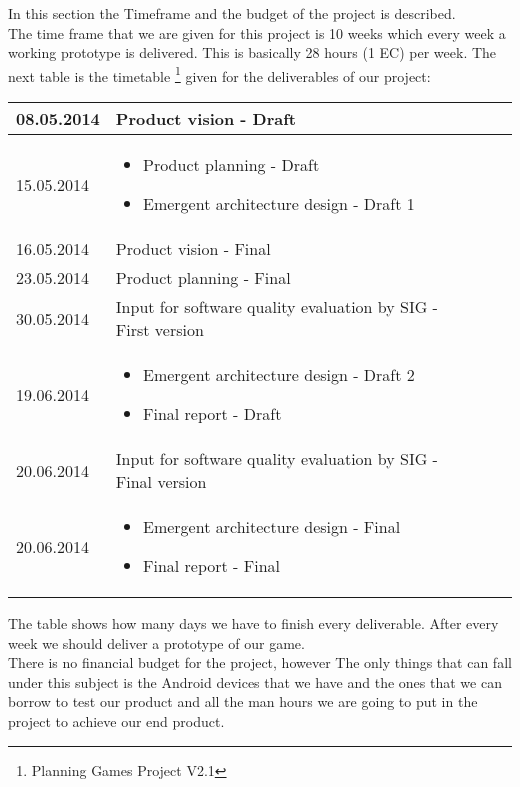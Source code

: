 In this section the Timeframe and the budget of the project is described. \\
The time frame that we are given for this project is 10 weeks which every week a working prototype is delivered. This is basically 28 hours (1 EC) per week. 
The next table is the timetable \footnote{Planning Games Project V2.1} given for the deliverables of our project:
\begin{center}
	\begin{tabular}{|  p{5cm} l || p{10cm}  l }
		\hline
	 	08.05.2014 & Product vision - Draft \\ \hline
		15.05.2014 & 
		\begin{itemize}
			\item Product planning - Draft
			\item Emergent architecture design - Draft 1
		\end{itemize} \\ \hline
		16.05.2014 & Product vision - Final \\ \hline
		23.05.2014 & Product planning - Final \\ \hline
		30.05.2014 & Input for software quality evaluation by SIG - First version \\ \hline
		19.06.2014 &
		\begin{itemize}
			\item Emergent architecture design - Draft 2
			\item Final report - Draft
		\end{itemize} \\ \hline
		20.06.2014 & Input for software quality evaluation by SIG - Final version \\ \hline
		20.06.2014 &
		\begin{itemize}
			\item Emergent architecture design - Final
			\item Final report - Final
		\end{itemize} \\
		\hline
	\end{tabular}
\end{center}
The table shows how many days we have to finish every deliverable. After every week we should deliver a prototype of our game. \\
\newline
There is no financial budget for the project, however The only things that can fall under this subject is the Android devices that we have and the ones that we can borrow to test our product and all the man hours we are going to put in the project to achieve our end product.